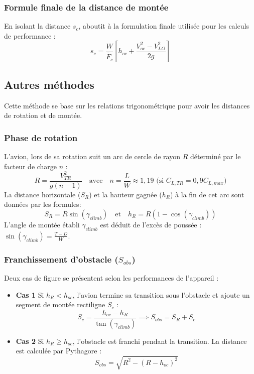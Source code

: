  		\subsubsection{Formule finale de la distance de montée}
 		En isolant la distance $s_c$, aboutit à la formulation finale utilisée pour les calculs de performance :
 		\[ s_c = \frac{W}{\bar{F}_c} \left[ h_{oc} + \frac{V_{oc}^2 - V_{LO}^2}{2g} \right] \]

 	\vspace*{1cm}
 		

 		\subsection{ Autres méthodes }
 		
 		Cette méthode se base sur les relations trigonométrique pour avoir les distances de rotation et de montée.
 		
 		\subsubsection{Phase de rotation}
 		L'avion, lors de sa rotation suit un arc de cercle de rayon $R$ déterminé par le facteur de charge $n$ :
 		\[
 		R = \frac{V_{TR}^2}{g(n - 1)} \quad \text{avec} \quad n = \frac{L}{W} \approx 1,19 \text{ (si } C_{L,TR} = 0,9 C_{L,max}\text{)} 
 		\]
 		La distance horizontale ($S_R$) et la hauteur gagnée ($h_R$) à la fin de cet arc sont données par les formules:
 		\[
 		S_R = R \sin(\gamma_{climb}) \quad \text{et} \quad h_R = R(1 - \cos(\gamma_{climb})) 
 		\]
 		L'angle de montée établi $\gamma_{climb}$ est déduit de l'excès de poussée : $\sin(\gamma_{climb}) = \frac{T - D}{W}$.
 		
 		\subsubsection{Franchissement d'obstacle ($S_{obs}$)}
 		Deux cas de figure se présentent selon les performances de l'appareil  :
 		\begin{itemize}
 			\item \textbf{Cas 1} Si $h_R < h_{oc}$, l'avion termine sa transition sous l'obstacle et ajoute un segment de montée rectiligne $S_c$ :
 			\[ S_c = \frac{h_{oc} - h_R}{\tan(\gamma_{climb})} \implies S_{obs} = S_R + S_c \]
 			\item \textbf{Cas 2} Si $h_R \geq h_{oc}$, l'obstacle est franchi pendant la transition. La distance est calculée par Pythagore :
 			\[ S_{obs} = \sqrt{R^2 - (R - h_{oc})^2} \]
 		\end{itemize}
 		
 
 	
 		
 			